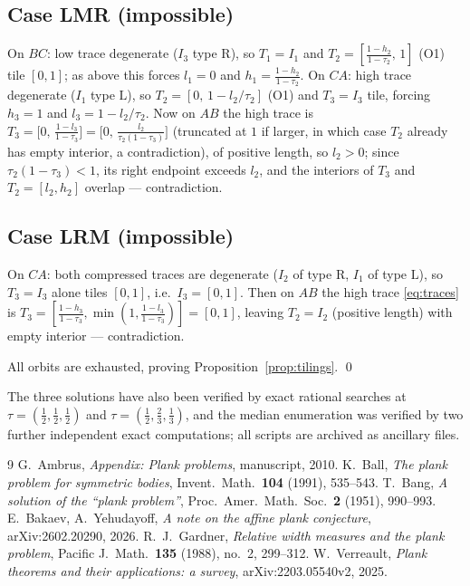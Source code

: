 \documentclass[11pt,reqno]{amsart}
\theoremstyle{plain}
\theoremstyle{definition}
\theoremstyle{remark}
\begin{document}
\subsection*{Case LMR \textup(impossible\textup)}
On $BC$: low trace degenerate ($I_3$ type $\mathrm R$), so $T_1=I_1$ and
$T_2=[\tfrac{1-h_2}{1-\tau_2},\,1]$ (O1) tile $[0,1]$; as above this forces
$l_1=0$ and $h_1=\tfrac{1-h_2}{1-\tau_2}$. On $CA$: high trace degenerate
($I_1$ type $\mathrm L$), so $T_2=[0,\,1-l_2/\tau_2]$ (O1) and $T_3=I_3$ tile,
forcing $h_3=1$ and $l_3=1-l_2/\tau_2$. Now on $AB$ the high trace is
$T_3=\bigl[0,\,\tfrac{1-l_3}{1-\tau_3}\bigr]
=\bigl[0,\,\tfrac{l_2}{\tau_2(1-\tau_3)}\bigr]$
(truncated at $1$ if larger, in which case $T_2$ already has empty interior, a
contradiction), of positive length, so $l_2>0$; since
$\tau_2(1-\tau_3)<1$, its right endpoint exceeds $l_2$, and the interiors of
$T_3$ and $T_2=[l_2,h_2]$ overlap --- contradiction.

\subsection*{Case LRM \textup(impossible\textup)}
On $CA$: both compressed traces are degenerate ($I_2$ of type $\mathrm R$,
$I_1$ of type $\mathrm L$), so $T_3=I_3$ alone tiles $[0,1]$, i.e.\
$I_3=[0,1]$. Then on $AB$ the high trace \eqref{eq:traces} is
$T_3=[\tfrac{1-h_3}{1-\tau_3},\min(1,\tfrac{1-l_3}{1-\tau_3})]=[0,1]$, leaving
$T_2=I_2$ (positive length) with empty interior --- contradiction.

\medskip
All orbits are exhausted, proving Proposition~\ref{prop:tilings}. \qed

\medskip
The three solutions have also been verified by exact rational searches at
$\tau=(\tfrac12,\tfrac12,\tfrac12)$ and $\tau=(\tfrac12,\tfrac23,\tfrac13)$,
and the median enumeration was verified by two further independent exact
computations; all scripts are archived as ancillary files.

\begin{thebibliography}{9}
 G.\ Ambrus, \emph{Appendix: Plank problems}, manuscript, 2010.
\bibitem{Ball91} K.\ Ball, \emph{The plank problem for symmetric bodies},
Invent.\ Math.\ \textbf{104} (1991), 535--543.
 T.\ Bang, \emph{A solution of the ``plank problem''},
Proc.\ Amer.\ Math.\ Soc.\ \textbf{2} (1951), 990--993.
 E.\ Bakaev, A.\ Yehudayoff, \emph{A note on the affine plank
conjecture}, arXiv:2602.20290, 2026.
 R.\ J.\ Gardner, \emph{Relative width measures and the plank
problem}, Pacific J.\ Math.\ \textbf{135} (1988), no.\ 2, 299--312.
\bibitem{Verreault} W.\ Verreault, \emph{Plank theorems and their applications: a
survey}, arXiv:2203.05540v2, 2025.
\end{thebibliography}
\end{document}
